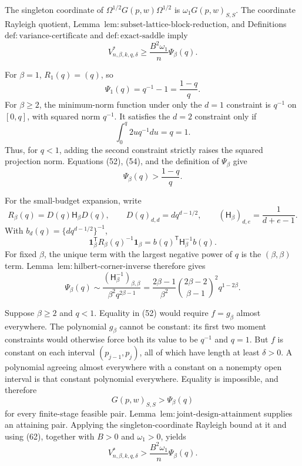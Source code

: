 The singleton coordinate of \(\Omega^{1/2}G(p,w)\Omega^{1/2}\) is \(\omega_1G(p,w)_{S,S}\).  The coordinate Rayleigh quotient, Lemma~\(\mathrm{lem{:}subset\text{-}lattice\text{-}block\text{-}reduction}\), and Definitions~\(\mathrm{def{:}variance\text{-}certificate}\) and \(\mathrm{def{:}exact\text{-}saddle}\) imply
\[
V^*_{n,\beta,k,q,\delta}
\ge\frac{B^2\omega_1}{n}\Psi_\beta(q).
\tag{56}
\]

For \(\beta=1\), \(R_1(q)=(q)\), so
\[
\Psi_1(q)=q^{-1}-1=\frac{1-q}{q}.
\tag{57}
\]
For \(\beta\ge2\), the minimum-norm function under only the \(d=1\) constraint is \(q^{-1}\) on \([0,q]\), with squared norm \(q^{-1}\).  It satisfies the \(d=2\) constraint only if
\[
\int_0^q2u q^{-1}du=q=1.
\]
Thus, for \(q<1\), adding the second constraint strictly raises the squared projection norm.  Equations (52), (54), and the definition of \(\Psi_\beta\) give
\[
\Psi_\beta(q)>\frac{1-q}{q}.
\tag{58}
\]

For the small-budget expansion, write
\[
R_\beta(q)=D(q)\mathsf H_\beta D(q),
\qquad
D(q)_{d,d}=d q^{d-1/2},
\qquad
(\mathsf H_\beta)_{d,e}=\frac1{d+e-1}.
\tag{59}
\]
With \(b_d(q)=\{d q^{d-1/2}\}^{-1}\),
\[
\mathbf1_\beta^{\mathsf T}R_\beta(q)^{-1}\mathbf1_\beta
=b(q)^{\mathsf T}\mathsf H_\beta^{-1}b(q).
\tag{60}
\]
For fixed \(\beta\), the unique term with the largest negative power of \(q\) is the \((\beta,\beta)\) term.  Lemma~\(\mathrm{lem{:}hilbert\text{-}corner\text{-}inverse}\) therefore gives
\[
\Psi_\beta(q)
\sim\frac{(\mathsf H_\beta^{-1})_{\beta,\beta}}
{\beta^2q^{2\beta-1}}
=\frac{2\beta-1}{\beta^2}
\binom{2\beta-2}{\beta-1}^{\!2}q^{1-2\beta}.
\tag{61}
\]

Suppose \(\beta\ge2\) and \(q<1\).  Equality in (52) would require \(f=g_\beta\) almost everywhere.  The polynomial \(g_\beta\) cannot be constant: its first two moment constraints would otherwise force both its value to be \(q^{-1}\) and \(q=1\).  But \(f\) is constant on each interval \((p_{j-1},p_j)\), all of which have length at least \(\delta>0\).  A polynomial agreeing almost everywhere with a constant on a nonempty open interval is that constant polynomial everywhere.  Equality is impossible, and therefore
\[
G(p,w)_{S,S}>\Psi_\beta(q)
\tag{62}
\]
for every finite-stage feasible pair.  Lemma~\(\mathrm{lem{:}joint\text{-}design\text{-}attainment}\) supplies an attaining pair.  Applying the singleton-coordinate Rayleigh bound at it and using (62), together with \(B>0\) and \(\omega_1>0\), yields
\[
V^*_{n,\beta,k,q,\delta}
>\frac{B^2\omega_1}{n}\Psi_\beta(q).
\tag{63}
\]

